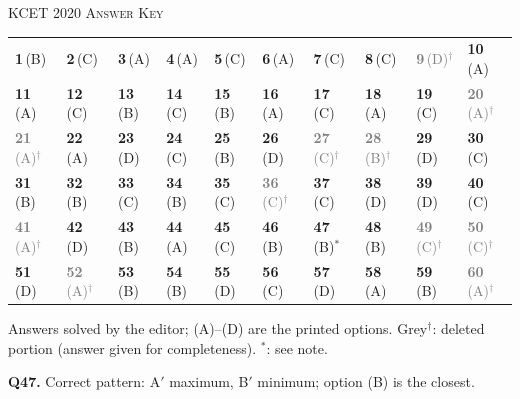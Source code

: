 \par{}\vspace{14pt}
\begin{center}{}\par
{\large\color{navy}\scshape KCET 2020 \textperiodcentered{} Answer Key}\end{center}
{\small\setlength{\tabcolsep}{1pt}\renewcommand{\arraystretch}{1.5}
\begin{tabularx}{\linewidth}{@{}*{10}{>{\centering\arraybackslash}X}@{}}\toprule
\textbf{1}\,(B) & \textbf{2}\,(C) & \textbf{3}\,(A) & \textbf{4}\,(A) & \textbf{5}\,(C) & \textbf{6}\,(A) & \textbf{7}\,(C) & \textbf{8}\,(C) & \textcolor{gray}{\textbf{9}\,(D)$^{\dagger}$} & \textbf{10}\,(A)\\
\textbf{11}\,(A) & \textbf{12}\,(C) & \textbf{13}\,(B) & \textbf{14}\,(C) & \textbf{15}\,(B) & \textbf{16}\,(A) & \textbf{17}\,(C) & \textbf{18}\,(A) & \textbf{19}\,(C) & \textcolor{gray}{\textbf{20}\,(A)$^{\dagger}$}\\
\textcolor{gray}{\textbf{21}\,(A)$^{\dagger}$} & \textbf{22}\,(A) & \textbf{23}\,(D) & \textbf{24}\,(C) & \textbf{25}\,(B) & \textbf{26}\,(D) & \textcolor{gray}{\textbf{27}\,(C)$^{\dagger}$} & \textcolor{gray}{\textbf{28}\,(B)$^{\dagger}$} & \textbf{29}\,(D) & \textbf{30}\,(C)\\
\textbf{31}\,(B) & \textbf{32}\,(B) & \textbf{33}\,(C) & \textbf{34}\,(B) & \textbf{35}\,(C) & \textcolor{gray}{\textbf{36}\,(C)$^{\dagger}$} & \textbf{37}\,(C) & \textbf{38}\,(D) & \textbf{39}\,(D) & \textbf{40}\,(C)\\
\textcolor{gray}{\textbf{41}\,(A)$^{\dagger}$} & \textbf{42}\,(D) & \textbf{43}\,(B) & \textbf{44}\,(A) & \textbf{45}\,(C) & \textbf{46}\,(B) & \textbf{47}\,(B)$^{*}$ & \textbf{48}\,(B) & \textcolor{gray}{\textbf{49}\,(C)$^{\dagger}$} & \textcolor{gray}{\textbf{50}\,(C)$^{\dagger}$}\\
\textbf{51}\,(D) & \textcolor{gray}{\textbf{52}\,(A)$^{\dagger}$} & \textbf{53}\,(B) & \textbf{54}\,(B) & \textbf{55}\,(D) & \textbf{56}\,(C) & \textbf{57}\,(D) & \textbf{58}\,(A) & \textbf{59}\,(B) & \textcolor{gray}{\textbf{60}\,(A)$^{\dagger}$}\\\bottomrule\end{tabularx}}\par\smallskip
{\footnotesize Answers solved by the editor; (A)--(D) are the printed options. {\color{gray}Grey$^{\dagger}$}: deleted portion (answer given for completeness). $^{*}$: see note.\par
\par\smallskip\textbf{Q47.} Correct pattern: A$'$ maximum, B$'$ minimum; option (B) is the closest.
}\par

